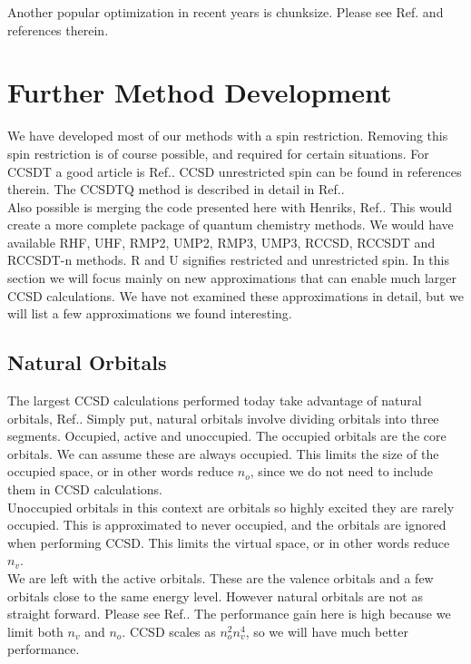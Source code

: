 \documentclass[a4paper,norsk,11pt,twoside]{report}
\begin{document}
Another popular optimization in recent years is chunksize. Please see Ref.\cite{aotomo_2_cite} and references therein.

\section{Further Method Development}
We have developed most of our methods with a spin restriction. Removing this spin restriction is of course possible, and required for certain situations. For CCSDT a good article is Ref.\cite{ccsdt_unrestricted_spin}. CCSD unrestricted spin can be found in references therein. The CCSDTQ method is described in detail in Ref.\cite{nevin_ccsdtq_duden}. \\

Also possible is merging the code presented here with Henriks, Ref.\cite{hmeiding}. This would create a more complete package of quantum chemistry methods. We would have available RHF, UHF, RMP2, UMP2, RMP3, UMP3, RCCSD, RCCSDT and RCCSDT-n methods. R and U signifies restricted and unrestricted spin. In this section we will focus mainly on new approximations that can enable much larger CCSD calculations. We have not examined these approximations in detail, but we will list a few approximations we found interesting. 

\subsection{Natural Orbitals}
The largest CCSD calculations performed today take advantage of natural orbitals, Ref.\cite{uno_cas_stas}. Simply put, natural orbitals involve dividing orbitals into three segments. Occupied, active and unoccupied. The occupied orbitals are the core orbitals. We can assume these are always occupied. This limits the size of the occupied space, or in other words reduce $n_o$, since we do not need to include them in CCSD calculations. \\

Unoccupied orbitals in this context are orbitals so highly excited they are rarely occupied. This is approximated to never occupied, and the orbitals are ignored when performing CCSD. This limits the virtual space, or in other words reduce $n_v$. \\

We are left with the active orbitals. These are the valence orbitals and a few orbitals close to the same energy level. However natural orbitals are not as straight forward. Please see Ref.\cite{natural_orbitals_ccsd}.  The performance gain here is high because we limit both $n_v$ and $n_o$. CCSD scales as $n_o^2 n_v^4$, so we will have much better performance. 
\end{document}
